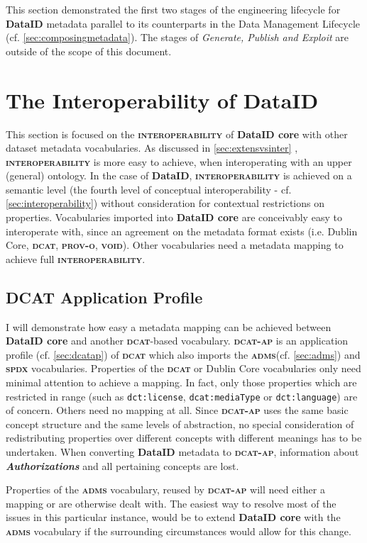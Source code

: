 \documentclass[a4paper,english,twoside,BCOR1.5cm,headsepline,DIV12,appendixprefix,final,12pt]{scrbook}
\newcommand{\interoperability}{{\ttfamily\scshape\bfseries interoperability}\xspace}
\newcommand{\dataid}{{\ttfamily\bfseries DataID}\xspace}
\newcommand{\core}{{\ttfamily\bfseries DataID core}\xspace}
\newcommand{\prov}{{\scshape\bfseries prov-o}\xspace}
\newcommand{\void}{{\scshape\bfseries void}\xspace}
\newcommand{\dcat}{{\scshape\bfseries dcat}\xspace}
\newcommand{\dcatap}{{\scshape\bfseries dcat-ap}\xspace}
\newcommand{\adms}{{\scshape\bfseries adms}\xspace}
\newcommand{\spdx}{{\scshape\bfseries spdx}\xspace}
\newcommand{\prop}[1]{{{\texttt{#1}}}}
\newcommand{\important}[1]{\textbf{\textit{#1}}}
\begin{document}
This section demonstrated the first two stages of the engineering lifecycle for \dataid metadata parallel to its counterparts in the Data Management Lifecycle (cf. \cref{sec:composingmetadata}). The stages of \textit{Generate, Publish and Exploit} are outside of the scope of this document.


\chapter{The Interoperability of DataID}
\label{chap:map}

This section is focused on the \interoperability of \core with other dataset metadata vocabularies. As discussed in \cref{sec:extensvsinter} , \interoperability is more easy to achieve, when interoperating with an upper (general) ontology. 
In the case of \dataid, \interoperability is achieved on a semantic level (the fourth level of conceptual interoperability - cf. \cref{sec:interoperability}) without consideration for contextual restrictions on properties. Vocabularies imported into \core are conceivably easy to interoperate with, since an agreement on the metadata format exists (i.e. Dublin Core, \dcat, \prov, \void). Other vocabularies need a metadata mapping to achieve full \interoperability.

\section{DCAT Application Profile} 
\label{sec:mapdcatap}

I will demonstrate how easy a metadata mapping can be achieved between \core and another \dcat{}-based vocabulary. \dcatap is an application profile (cf. \cref{sec:dcatap}) of \dcat which also imports the \adms (cf. \cref{sec:adms}) and \spdx vocabularies. Properties of the \dcat or Dublin Core vocabularies only need minimal attention to achieve a mapping. In fact, only those properties which are restricted in range (such as \prop{dct:license}, \prop{dcat:mediaType} or \prop{dct:language}) are of concern. Others need no mapping at all. Since \dcatap uses the same basic concept structure and the same levels of abstraction, no special consideration of redistributing properties over different concepts with different meanings has to be undertaken. When converting \dataid metadata to \dcatap, information about \important{Authorizations} and all pertaining concepts are lost.

Properties of the \adms vocabulary, reused by \dcatap will need either a mapping or are otherwise dealt with. 
The easiest way to resolve most of the issues in this particular instance, would be to extend \core with the \adms vocabulary if the surrounding circumstances would allow for this change.
\end{document}
